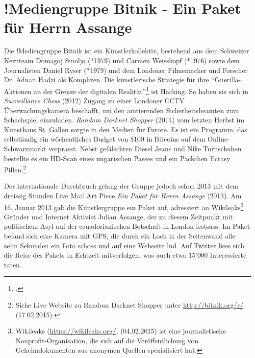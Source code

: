 \documentclass[
paper=164mm:234mm, %
pagesize, %
DIV=calc, %
10pt, %
parskip=half- %
]{scrbook}
\begin{document}
{}
\section*{!Mediengruppe Bitnik - Ein Paket für Herrn Assange}

Die !Mediengruppe Bitnik ist ein Künstlerkollektiv, bestehend aus dem Schweizer Kernteam Domagoj Smoljo (*1979) und Carmen Weisskopf (*1976) sowie dem Journalisten Daniel Ryser (*1979) und dem Londoner Filmemacher und Forscher Dr. Adnan Hadzi als Komplizen. Die künstlerische Strategie für ihre \enquote{Guerilla-Aktionen an der Grenze der digitalen Realität}\footnote{\cite{Diener:2013}.} ist Hacking. So haben sie sich in \emph{Surveillance Chess} (2012) Zugang zu einer Londoner CCTV Überwachungskamera beschafft, um den amtierenden Sicherheitsbeamten zum Schachspiel einzuladen. \emph{Random Darknet Shopper} (2014) vom letzten Herbst im Kunsthaus St. Gallen sorgte in den Medien für Furore. Es ist ein Programm, das selbständig ein wöchentliches Budget von \$100 in Bitcoins auf dem Online-Schwarzmarkt verprasst. Nebst gefälschten Diesel Jeans und Nike Turnschuhen bestellte es ein HD-Scan eines ungarischen Passes und ein Päckchen Ectasy Pillen.\footnote{Siehe Live-Website zu Random Darknet Shopper unter \url{http://bitnik.org/r/} (17.02.2015).}

Der internationale Durchbruch gelang der Gruppe jedoch schon 2013 mit dem dreissig Stunden Live Mail Art Piece \emph{Ein Paket für Herrn Assange} (2013). Am 16. Januar 2013 gab die Künstlergruppe ein Paket auf, adressiert an Wikileaks\footnote{Wikileaks (\url{https://wikileaks.org/}, (04.02.2015) ist eine journalistische Nonprofit-Organisation, die sich auf die Veröffentlichung von Geheimdokumenten aus anonymen Quellen spezialisiert hat.} Gründer und Internet Aktivist Julian Assange, der zu diesem Zeitpunkt mit politischem Asyl auf der ecuadorianischen Botschaft in London festsass. Im Paket befand sich eine Kamera mit GPS, die durch ein Loch in der Seitenwand alle zehn Sekunden ein Foto schoss und auf eine Webseite lud. Auf Twitter liess sich die Reise des Pakets in Echtzeit mitverfolgen, was auch etwa 15'000 Interessierte taten.
\end{document}
